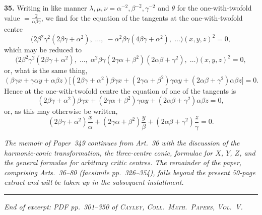 \documentclass[11pt,a4paper]{article}
\begin{document}
\medskip

\textbf{35.} Writing in like manner $\lambda, \mu, \nu = \alpha^{-2}, \beta^{-2}, \gamma^{-2}$ and $\theta$ for the one-with-twofold value $= \tfrac{2}{\alpha\beta\gamma}$, we find for the equation of the tangents at the one-with-twofold centre
\[
\bigl(2\beta^2\gamma^2(2\beta\gamma + \alpha^2),\;\ldots,\;-\alpha^2\beta\gamma(4\beta\gamma + \alpha^2),\;\ldots\bigr)(x, y, z)^2 = 0,
\]
which may be reduced to
\[
\bigl(2\beta^2\gamma^2(2\beta\gamma + \alpha^2),\;\ldots,\;\alpha^2\beta\gamma(2\gamma\alpha + \beta^2)(2\alpha\beta + \gamma^2),\;\ldots\bigr)(x, y, z)^2 = 0,
\]
or, what is the same thing,
\[
(\beta\gamma x + \gamma\alpha y + \alpha\beta z)\bigl[(2\beta\gamma + \alpha^2)\beta\gamma x + (2\gamma\alpha + \beta^2)\gamma\alpha y + (2\alpha\beta + \gamma^2)\alpha\beta z\bigr] = 0.
\]
Hence at the one-with-twofold centre the equation of one of the tangents is
\[
(2\beta\gamma + \alpha^2)\beta\gamma x + (2\gamma\alpha + \beta^2)\gamma\alpha y + (2\alpha\beta + \gamma^2)\alpha\beta z = 0,
\]
or, as this may otherwise be written,
\[
(2\beta\gamma + \alpha^2)\frac{x}{\alpha} + (2\gamma\alpha + \beta^2)\frac{y}{\beta} + (2\alpha\beta + \gamma^2)\frac{z}{\gamma} = 0.
\]

\medskip

\noindent\textit{The memoir of Paper~349 continues from Art.~36 with the discussion of the harmonic-conic transformation, the three-centre conic, formulae for $X$, $Y$, $Z$, and the general formulae for arbitrary critic centres. The remainder of the paper, comprising Arts.~36--80 (facsimile pp.~326--354), falls beyond the present 50-page extract and will be taken up in the subsequent installment.}

\bigskip
\noindent\rule{\textwidth}{0.4pt}
\bigskip

\begin{center}
\textit{End of excerpt: PDF pp.~301--350 of \textsc{Cayley, Coll.\ Math.\ Papers, Vol.~V}.}
\end{center}
\end{document}
